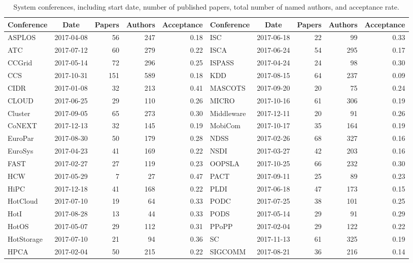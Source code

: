 \documentclass[12pt]{article}
\begin{document}
\begin{table}

\caption{\label{tab:sys-confs}System conferences, including start date, number of published papers, total number of named authors, and acceptance rate.}
\centering
\fontsize{8}{10}\selectfont
\begin{tabular}[t]{|lcrrr||lcrrr|}
\toprule
Conference & Date & Papers & Authors & Acceptance & Conference & Date & Papers & Authors & Acceptance\\
\midrule
ASPLOS & 2017-04-08 & 56 & 247 & 0.18 & ISC & 2017-06-18 & 22 & 99 & 0.33\\
ATC & 2017-07-12 & 60 & 279 & 0.22 & ISCA & 2017-06-24 & 54 & 295 & 0.17\\
CCGrid & 2017-05-14 & 72 & 296 & 0.25 & ISPASS & 2017-04-24 & 24 & 98 & 0.30\\
CCS & 2017-10-31 & 151 & 589 & 0.18 & KDD & 2017-08-15 & 64 & 237 & 0.09\\
CIDR & 2017-01-08 & 32 & 213 & 0.41 & MASCOTS & 2017-09-20 & 20 & 75 & 0.24\\
CLOUD & 2017-06-25 & 29 & 110 & 0.26 & MICRO & 2017-10-16 & 61 & 306 & 0.19\\
Cluster & 2017-09-05 & 65 & 273 & 0.30 & Middleware & 2017-12-11 & 20 & 91 & 0.26\\
CoNEXT & 2017-12-13 & 32 & 145 & 0.19 & MobiCom & 2017-10-17 & 35 & 164 & 0.19\\
EuroPar & 2017-08-30 & 50 & 179 & 0.28 & NDSS & 2017-02-26 & 68 & 327 & 0.16\\
EuroSys & 2017-04-23 & 41 & 169 & 0.22 & NSDI & 2017-03-27 & 42 & 203 & 0.16\\
FAST & 2017-02-27 & 27 & 119 & 0.23 & OOPSLA & 2017-10-25 & 66 & 232 & 0.30\\
HCW & 2017-05-29 & 7 & 27 & 0.47 & PACT & 2017-09-11 & 25 & 89 & 0.23\\
HiPC & 2017-12-18 & 41 & 168 & 0.22 & PLDI & 2017-06-18 & 47 & 173 & 0.15\\
HotCloud & 2017-07-10 & 19 & 64 & 0.33 & PODC & 2017-07-25 & 38 & 101 & 0.25\\
HotI & 2017-08-28 & 13 & 44 & 0.33 & PODS & 2017-05-14 & 29 & 91 & 0.29\\
HotOS & 2017-05-07 & 29 & 112 & 0.31 & PPoPP & 2017-02-04 & 29 & 122 & 0.22\\
HotStorage & 2017-07-10 & 21 & 94 & 0.36 & SC & 2017-11-13 & 61 & 325 & 0.19\\
HPCA & 2017-02-04 & 50 & 215 & 0.22 & SIGCOMM & 2017-08-21 & 36 & 216 & 0.14\\

\end{tabular}
\end{table}
\end{document}

